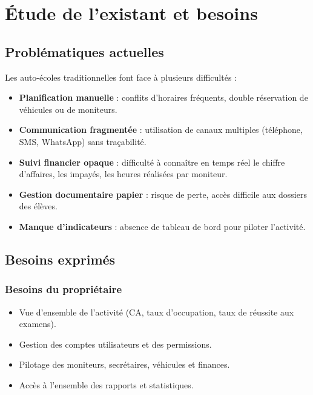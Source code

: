 \documentclass[12pt,a4paper]{article}
\newcommand{\highlight}[1]{\textbf{\color{primary}#1}}
\begin{document}
\section{Étude de l'existant et besoins}

\subsection{Problématiques actuelles}

Les auto-écoles traditionnelles font face à plusieurs difficultés :

\begin{itemize}[leftmargin=*,itemsep=4pt]
    \item \highlight{Planification manuelle} : conflits d'horaires fréquents, double réservation de véhicules ou de moniteurs.
    \item \highlight{Communication fragmentée} : utilisation de canaux multiples (téléphone, SMS, WhatsApp) sans traçabilité.
    \item \highlight{Suivi financier opaque} : difficulté à connaître en temps réel le chiffre d'affaires, les impayés, les heures réalisées par moniteur.
    \item \highlight{Gestion documentaire papier} : risque de perte, accès difficile aux dossiers des élèves.
    \item \highlight{Manque d'indicateurs} : absence de tableau de bord pour piloter l'activité.
\end{itemize}

\subsection{Besoins exprimés}

\subsubsection{Besoins du propriétaire}

\begin{itemize}[leftmargin=*,itemsep=4pt]
    \item Vue d'ensemble de l'activité (CA, taux d'occupation, taux de réussite aux examens).
    \item Gestion des comptes utilisateurs et des permissions.
    \item Pilotage des moniteurs, secrétaires, véhicules et finances.
    \item Accès à l'ensemble des rapports et statistiques.
\end{itemize}
\end{document}
